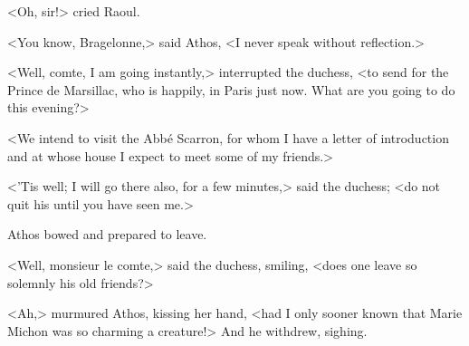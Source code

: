 <Oh, sir!> cried Raoul.

<You know, Bragelonne,> said Athos, <I never speak without reflection.>

<Well, comte, I am going instantly,> interrupted the duchess, <to send for the Prince de Marsillac, who is happily, in Paris just now. What are you going to do this evening?>

<We intend to visit the Abbé Scarron, for whom I have a letter of introduction and at whose house I expect to meet some of my friends.>

<'Tis well; I will go there also, for a few minutes,> said the duchess; <do not quit his  until you have seen me.>

Athos bowed and prepared to leave.

<Well, monsieur le comte,> said the duchess, smiling, <does one leave so solemnly his old friends?>

<Ah,> murmured Athos, kissing her hand, <had I only sooner known that Marie Michon was so charming a creature!> And he withdrew, sighing. 